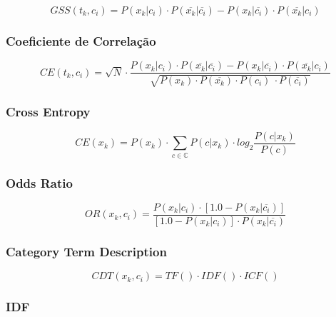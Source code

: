 \begin{equation}\label{eqn::gss}
   GSS(t_k, c_i) = P(x_k|c_i) \cdot P(\overline{x_k}|\overline{c_i}) - P(x_k|\overline{c_i}) \cdot P(\overline{x_k}|c_i) 
\end{equation}

\subsubsection{Coeficiente de Correlação}
\label{subsubsection::cc}
\cite{Zheng03}
\begin{equation}\label{eqn::ce}
   CE(t_k, c_i) = \sqrt{N} \cdot \frac{ P(x_k|c_i) \cdot P(\overline{x_k}|\overline{c_i}) - P(x_k|\overline{c_i}) \cdot P(\overline{x_k}|c_i) } {\sqrt{ P(x_k) \cdot P(\overline{x_k}) \cdot P(c_i) \ \cdot P(\overline{c_i}) } }
\end{equation}

\subsubsection{Cross Entropy}
\label{subsubsection::}
\cite{Shang07}
\begin{equation}\label{eqn::ce}
   CE(x_k) =  P(x_k) \cdot \sum_{c \in \mathbb{C}} P(c|x_k) \cdot log_2 \frac{ P(c|x_k) } { P(c) }
\end{equation}

\subsubsection{Odds Ratio}
\label{subsubsection::or}

\cite{Zheng03}
\begin{equation}\label{eqn::or}
   OR(x_k, c_i) = \frac{ P(x_k|c_i) \cdot [ 1.0 - P(x_k|\overline{c_i}) ] }{ [ 1.0 - P(x_k|c_i) ] \cdot P(x_k|\overline{c_i})}
\end{equation}

\subsubsection{Category Term Description}
\label{subsubsection::ctd}
\cite{ChihHow04}
\begin{equation}\label{eqn::cdt}
   CDT(x_k, c_i) = TF() \cdot IDF() \cdot ICF()
\end{equation}


\subsubsection{IDF}
\label{subsubsection::idf}

